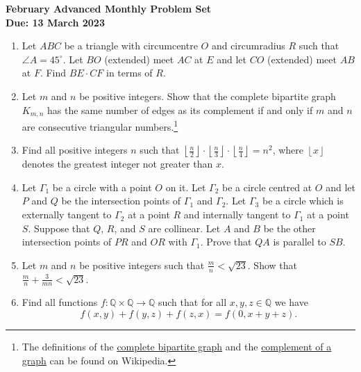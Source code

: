 \documentclass{article}
\newcommand*{\floor}[1]{\left\lfloor#1\right\rfloor}
\begin{document}
\thispagestyle{empty}

\begin{center}
  \textbf{\Large February Advanced Monthly Problem Set}
  \\ \vspace{1em}
  \textbf{\large Due: 13 March 2023}
\end{center}

\bigskip

\begin{enumerate}[itemsep=\fill]

\item %
Let $ABC$ be a triangle with circumcentre $O$ and circumradius $R$ such that $\angle A = 45^\circ$.
Let $BO$ (extended) meet $AC$ at $E$ and let $CO$ (extended) meet $AB$ at $F$.
Find $BE \cdot CF$ in terms of $R$.

 
\item %
Let $m$ and $n$ be positive integers.
Show that the complete bipartite graph $K_{m,n}$ has the same number of edges as its complement if and only if $m$ and $n$ are consecutive triangular numbers.\footnote{The definitions of the \href{https://en.wikipedia.org/wiki/Complete_bipartite_graph}{complete bipartite graph} and the \href{https://en.wikipedia.org/wiki/Complement_graph}{complement of a graph} can be found on Wikipedia.}


\item %
Find all positive integers $n$ such that $\displaystyle \floor{\frac{n}{2}} \cdot \floor{\frac{n}{3}} \cdot \floor{\frac{n}{4}} = n^2$, where $\floor{x}$ denotes the greatest integer not greater than $x$.


\item %
Let $\Gamma_1$ be a circle with a point $O$ on it.
Let $\Gamma_2$ be a circle centred at $O$ and let $P$ and $Q$ be the intersection points of $\Gamma_1$ and $\Gamma_2$.
Let $\Gamma_3$ be a circle which is externally tangent to $\Gamma_2$ at a point $R$ and internally tangent to $\Gamma_1$ at a point $S$.
Suppose that $Q$, $R$, and $S$ are collinear.
Let $A$ and $B$ be the other intersection points of $PR$ and $OR$ with $\Gamma_1$.
Prove that $QA$ is parallel to $SB$.


\item %
Let $m$ and $n$ be positive integers such that $\displaystyle \frac{m}{n} < \sqrt{23}$.
Show that $\displaystyle \frac{m}{n} +\frac{3}{mn} < \sqrt{23}$.


\item %
Find all functions $f : \mathbb{Q} \times \mathbb{Q} \to \mathbb{Q}$ such that for all $x, y, z \in \mathbb{Q}$ we have
\[ f(x,y) +f(y,z) +f(z,x) = f(0,x+y+z). \]



\end{enumerate}
\end{document}
